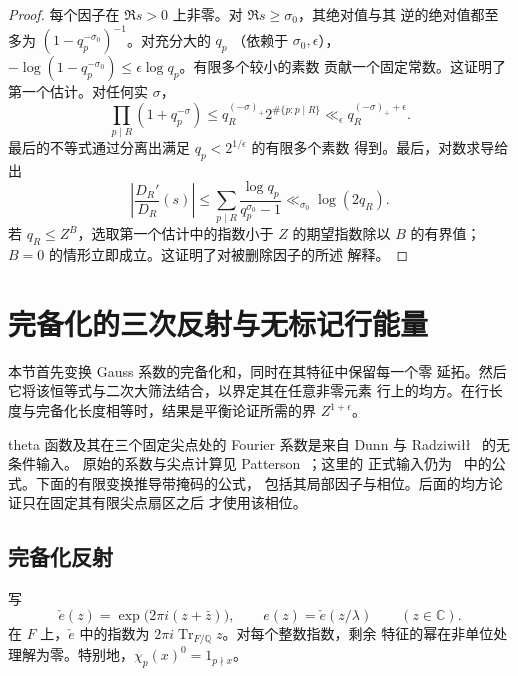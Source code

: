 \documentclass[11pt,a4paper]{article}
\numberwithin{equation}{section}
\numberwithin{figure}{section}
\theoremstyle{definition}
\theoremstyle{remark}
\begin{document}
\begin{proof}
每个因子在 $\Re s>0$ 上非零。对 $\Re s\ge\sigma_0$，其绝对值与其
逆的绝对值都至多为 $(1-q_p^{-\sigma_0})^{-1}$。对充分大的 $q_p$
（依赖于 $\sigma_0,\epsilon$），
$-\log(1-q_p^{-\sigma_0})\le\epsilon\log q_p$。有限多个较小的素数
贡献一个固定常数。这证明了第一个估计。对任何实 $\sigma$，
\[
 \prod_{p\mid R}(1+q_p^{-\sigma})
 \le q_R^{(-\sigma)_+}2^{\#\{p:p\mid R\}}
 \ll_\epsilon q_R^{(-\sigma)_++\epsilon}.
\]
最后的不等式通过分离出满足 $q_p<2^{1/\epsilon}$ 的有限多个素数
得到。最后，对数求导给出
\[
 \left|\frac{D_R'}{D_R}(s)\right|
 \le\sum_{p\mid R}\frac{\log q_p}{q_p^{\sigma_0}-1}
 \ll_{\sigma_0}\log(2q_R).
\]
若 $q_R\le Z^B$，选取第一个估计中的指数小于 $Z$ 的期望指数除以
$B$ 的有界值；$B=0$ 的情形立即成立。这证明了对被删除因子的所述
解释。
\end{proof}

\section{完备化的三次反射与无标记行能量}
\label{sec:completed-reflection}

本节首先变换 Gauss 系数的完备化和，同时在其特征中保留每一个零
延拓。然后它将该恒等式与二次大筛法结合，以界定其在任意非零元素
行上的均方。在行长度与完备化长度相等时，结果是平衡论证所需的界
$Z^{1+\epsilon}$。

theta 函数及其在三个固定尖点处的 Fourier 系数是来自 Dunn 与
Radziwi{\l}{\l}~\cite[第~5 节与附录~A]{DR} 的无条件输入。
原始的系数与尖点计算见
Patterson~\cite[定理~8.1 与第~7--8 节]{Patterson}；这里的
正式输入仍为~\cite{DR} 中的公式。下面的有限变换推导带掩码的公式，
包括其局部因子与相位。后面的均方论证只在固定其有限尖点扇区之后
才使用该相位。

\subsection{完备化反射}

写
\[
 \check e(z)=\exp\bigl(2\pi i(z+\bar z)\bigr),
 \qquad e(z)=\check e(z/\lambda)\qquad(z\in\mathbb C).
\]
在 $F$ 上，$\check e$ 中的指数为
$2\pi i\operatorname{Tr}_{F/\mathbb Q}z$。对每个整数指数，剩余
特征的幂在非单位处理解为零。特别地，$\chi_p(x)^0=1_{p\nmid x}$。
\end{document}
